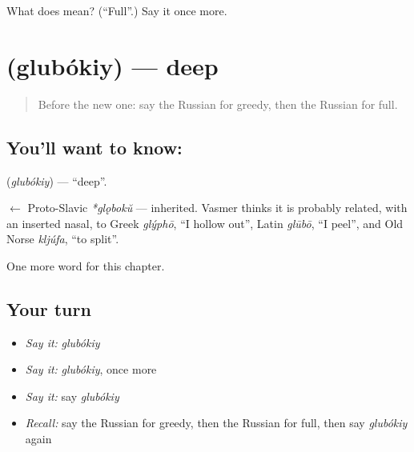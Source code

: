 \begin{tcolorbox}[breakable,colback=teal!4,colframe=teal!35!black,title={Before you move on}]
What does  mean? (\textquotedblleft{}Full\textquotedblright{}.) Say it once more.
\end{tcolorbox}
\section[\texorpdfstring{\ru{глубокий} (glubókiy)}{глубокий (glubókiy)}]{ (glubókiy) — deep}

\label{lesson:RU-C187-glubokiy}



\begin{quote}
Before the new one: say the Russian for greedy, then the Russian for full.
\end{quote}

\subsection*{You'll want to know: }
\textbf{} (\emph{glubókiy}) — \textquotedblleft{}deep\textquotedblright{}.

\begin{cousinweb}
\textbf{} $\leftarrow$ Proto-Slavic \emph{*glǫbokŭ} — inherited. Vasmer thinks it is probably related, with an inserted nasal, to Greek \emph{glýphō}, \textquotedblleft{}I hollow out\textquotedblright{}, Latin \emph{glūbō}, \textquotedblleft{}I peel\textquotedblright{}, and Old Norse \emph{kljúfa}, \textquotedblleft{}to split\textquotedblright{}.
\end{cousinweb}

\begin{grammarlens}[title={What you've built}]
One more word for this chapter.
\end{grammarlens}

\subsection*{Your turn}
\begin{itemize}
\raggedright
  \item \emph{Say it:} \emph{glubókiy}
  \item \emph{Say it:} \emph{glubókiy}, once more
  \item \emph{Say it:} say \emph{glubókiy}
  \item \emph{Recall:} say the Russian for greedy, then the Russian for full, then say \emph{glubókiy} again
\end{itemize}

